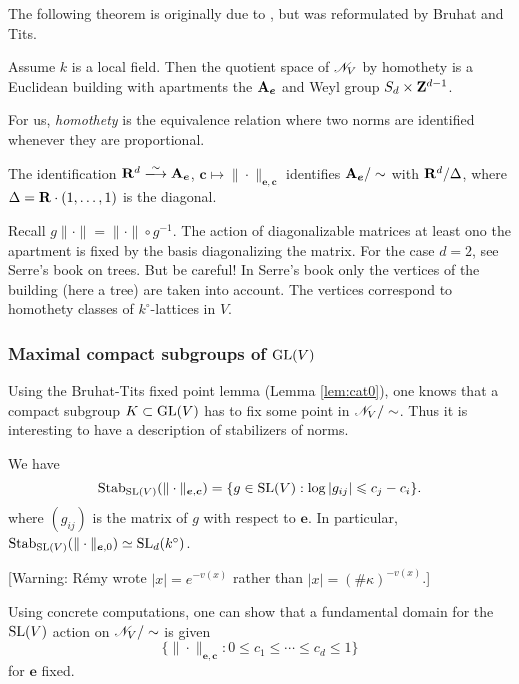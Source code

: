The following theorem is originally due to \cite{gi63}, but was reformulated by 
Bruhat and Tits. 

\begin{theo}
Assume $k$ is a local field. Then 
the quotient space of $\mathscr{N}_V$ by homothety is a Euclidean building with 
apartments the $\mathbf{A}_{\boldsymbol e}$ and Weyl 
group $S_d\times \mathbf{Z}^{d-1}$. 
\end{theo}

For us, \emph{homothety} is the equivalence relation where two norms are identified 
whenever they are proportional. 

The identification $\dR^d\isomorphism \dA_{\boldsymbol e}$, 
$\boldsymbol c\mapsto \|\cdot\|_{\boldsymbol e,\boldsymbol c}$ identifies 
$\mathbf{A}_{\boldsymbol e}/\sim$ with $\mathbf{R}^d/\Delta$, where 
$\Delta=\mathbf{R}\cdot (1,\dots,1)$ is the diagonal. 

Recall $g \|\cdot\| = \|\cdot\|\circ g^{-1}$. The action of diagonalizable matrices at 
least ono the apartment is fixed by the basis diagonalizing the matrix. For the case 
$d=2$, see Serre's book on trees. But be careful! In Serre's book only the vertices 
of the building (here a tree) are taken into account. The vertices correspond 
to homothety classes of $k^\circ$-lattices in $V$. 


\subsubsection{Maximal compact subgroups of \texorpdfstring{$\operatorname{GL}(V)$}{GL(V)}}

Using the Bruhat-Tits fixed point lemma (Lemma \ref{lem:cat0}), one knows that a 
compact subgroup $K\subset \operatorname{GL}(V)$ has to fix some point in 
$\mathscr{N}_V/\sim$. Thus it is interesting to have a description of stabilizers of 
norms. 

\begin{prop}
We have 
\[
  \operatorname{Stab}_{\operatorname{SL}(V)}(\|\cdot\|_{\boldsymbol e,\boldsymbol c}) = \{g\in \operatorname{SL}(V): \log |g_{i j}| \leqslant c_j - c_i\} .
\]
where $(g_{i j})$ is the matrix of $g$ with respect to $\boldsymbol e$. 
In particular, $\operatorname{Stab}_{\operatorname{SL}(V)}(\|\cdot\|_{\boldsymbol e,0}) \simeq \operatorname{SL}_d(k^\circ)$. 
\end{prop}

[Warning: R\'emy wrote $|x|=e^{-v(x)}$ rather than 
$|x|=(\# \kappa)^{-v(x)}$.] 

Using concrete computations, one can show that a fundamental domain for the 
$\operatorname{SL}(V)$ action on $\mathscr{N}_V/\sim$ is given 
\[
  \{\|\cdot\|_{\boldsymbol e,\boldsymbol c}:0\leqslant c_1 \leqslant \cdots \leqslant c_d \leqslant 1\} 
\]
for $\boldsymbol e$ fixed. 

